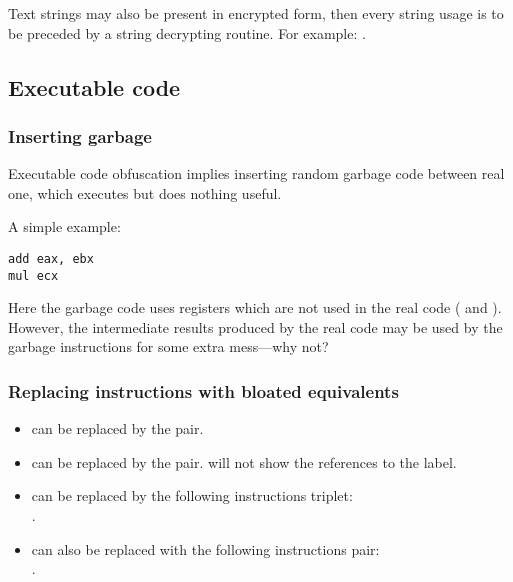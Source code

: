 Text strings may also be present in encrypted form, 
then every string usage is to be preceded by a string decrypting routine.
For example: .

\subsection{Executable code}

\subsubsection{Inserting garbage}

Executable code obfuscation implies inserting random garbage code between real one,
which executes but does nothing useful.

A simple example:

\begin{lstlisting}[caption=original code,style=customasmx86]
add	eax, ebx
mul	ecx
\end{lstlisting}



Here the garbage code uses registers which are not used in the real code ( and ).
However, the intermediate results produced by the real code 
may be used by the garbage instructions for some extra mess---why not?

\subsubsection{Replacing instructions with bloated equivalents}

\begin{itemize}
\item {} can be replaced by the  pair.
\item {} can be replaced by the  pair. 
\IDA{} will not show the references to the label.
\item {} can be replaced by the following instructions triplet:\\
.
\item {} can also be replaced with the following instructions pair: \\
.%

\end{itemize}

